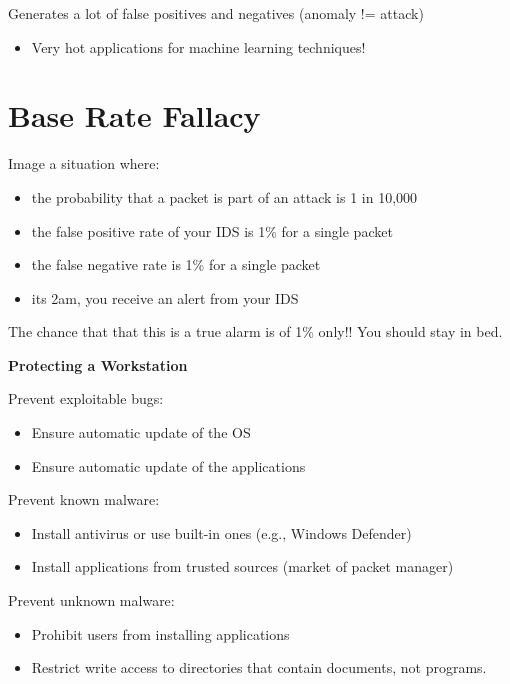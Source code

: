 \documentclass[11pt]{article}
\begin{document}
Generates a lot of false positives and negatives (anomaly != attack)

\begin{itemize}
	\item Very hot applications for machine learning techniques!
\end{itemize}

\section*{Base Rate Fallacy}
Image a situation where:
\begin{itemize}
	\item the probability that a packet is part of an attack is 1 in 10,000
	\item the false positive rate of your IDS is 1\% for a single packet
	\item the false negative rate is 1\% for a single packet
	\item its 2am, you receive an alert from your IDS
\end{itemize}

The chance that that this is a true alarm is of 1\% only!! You should stay in bed. 
\vspace{0.5cm}

\begin{center}
  {\LARGE \textbf{Protecting a Workstation}}
\end{center}
\vspace{0.5cm}

Prevent exploitable bugs:
\begin{itemize}
	\item Ensure automatic update of the OS
	\item Ensure automatic update of the applications
\end{itemize}

Prevent known malware:
\begin{itemize}
	\item Install antivirus or use built-in ones (e.g., Windows Defender)
	\item Install applications from trusted sources (market of packet manager)
\end{itemize}

Prevent unknown malware:
\begin{itemize}
	\item Prohibit users from installing applications
	\item Restrict write access to directories that contain documents, not programs. 
\end{itemize}
\end{document}

